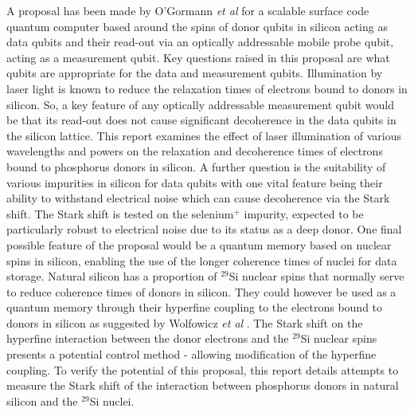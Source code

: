 
A proposal has been made by O'Gormann \emph{et al} \cite{OGorman2014} for a scalable surface code quantum computer based around the spins of donor qubits in silicon acting as data qubits and their read-out via an optically addressable mobile probe qubit, acting as a measurement qubit. Key questions raised in this proposal are what qubits are appropriate for the data and measurement qubits.
Illumination by laser light is known to reduce the relaxation times of electrons bound to donors in silicon. So, a key feature of any optically addressable measurement qubit would be that its read-out does not cause significant decoherence in the data qubits in the silicon lattice. This report examines the effect of laser illumination of various wavelengths and powers on the relaxation and decoherence times of electrons bound to phosphorus donors in silicon.
A further question is the suitability of various impurities in silicon for data qubits with one vital feature being their ability to withstand electrical noise which can cause decoherence via the Stark shift.
The Stark shift is tested on the selenium$^{+}$ impurity, expected to be particularly robust to electrical noise due to its status as a deep donor.
One final possible feature of the proposal would be a quantum memory based on nuclear spins in silicon, enabling the use of the longer coherence times of nuclei for data storage.
Natural silicon has a proportion of $^{29}$Si nuclear spins that normally serve to reduce coherence times of donors in silicon. They could however be used as a quantum memory through their hyperfine coupling to the electrons bound to donors in silicon as suggested by Wolfowicz \emph{et al} \cite{Wolfowicz2016a}. The Stark shift on the hyperfine interaction between the donor electrons and the $^{29}$Si nuclear spins presents a potential control method - allowing modification of the hyperfine coupling. To verify the potential of this proposal, this report details attempts to measure the Stark shift of the interaction between phosphorus donors in natural silicon and the $^{29}$Si nuclei.